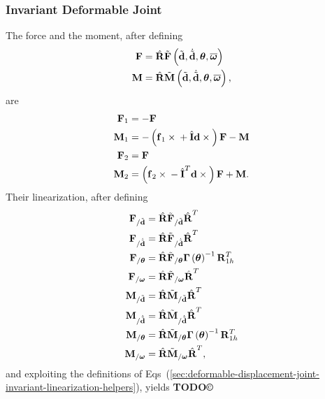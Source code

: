 \documentclass[10pt,dvips,fleqn,subeqn]{report}
\newcommand{\T}[1]{\bm{\mathbf{#1}}}
\begin{document}
\subsubsection{Invariant Deformable Joint}
The force and the moment, after defining
\begin{subequations}
\begin{align}
	\T{F} &= \hat{\T{R}}
		\tilde{\T{F}}\plbr{
			\tilde{\T{d}},
			\dot{\tilde{\T{d}}},
			\T{\theta},
			\overline{\T{\omega}}
		} \\
	\T{M} &= \hat{\T{R}}
		\tilde{\T{M}}\plbr{
			\tilde{\T{d}},
			\dot{\tilde{\T{d}}},
			\T{\theta},
			\overline{\T{\omega}}
		} ,
\end{align}
\end{subequations}
are
\begin{subequations}
\begin{align}
	\T{F}_1 &= - \T{F} \\
	\T{M}_1 &= - \plbr{
		\T{f}_1 \times{}
		+ \hat{\T{I}} \T{d}\times{}
	} \T{F} - \T{M} \\
	\T{F}_2 &= \T{F} \\
	\T{M}_2 &= \plbr{
		\T{f}_2 \times{}
		- \hat{\T{I}}^T \T{d}\times{}
	} \T{F} + \T{M} .
\end{align}
\end{subequations}
Their linearization, after defining
\begin{subequations}
\begin{align}
	\T{F}_{/\tilde{\T{d}}} &=
		\hat{\T{R}} \tilde{\T{F}}_{/\tilde{\T{d}}} \hat{\T{R}}^T \\
	\T{F}_{/\dot{\tilde{\T{d}}}} &=
		\hat{\T{R}} \tilde{\T{F}}_{/\dot{\tilde{\T{d}}}} \hat{\T{R}}^T \\
	\T{F}_{/\T{\theta}}
		&= \hat{\T{R}} \tilde{\T{F}}_{/\T{\theta}} \T{\Gamma}\plbr{\T{\theta}}^{-1} \T{R}_{1h}^T \\
	\T{F}_{/\T{\omega}}
		&= \hat{\T{R}} \tilde{\T{F}}_{/\T{\omega}} \hat{\T{R}}^T \\
	\T{M}_{/\tilde{\T{d}}} &=
		\hat{\T{R}} \tilde{\T{M}}_{/\tilde{\T{d}}} \hat{\T{R}}^T \\
	\T{M}_{/\dot{\tilde{\T{d}}}} &=
		\hat{\T{R}} \tilde{\T{M}}_{/\dot{\tilde{\T{d}}}} \hat{\T{R}}^T \\
	\T{M}_{/\T{\theta}}
		&= \hat{\T{R}} \tilde{\T{M}}_{/\T{\theta}} \T{\Gamma}\plbr{\T{\theta}}^{-1} \T{R}_{1h}^T \\
	\T{M}_{/\T{\omega}}
		&= \hat{\T{R}} \tilde{\T{M}}_{/\T{\omega}} \hat{\T{R}}^T ,
\end{align}
\end{subequations}
and exploiting the definitions of
Eqs~(\ref{sec:deformable-displacement-joint-invariant-linearization-helpers}),
yields \textbf{TODO\copyright}
\end{document}

